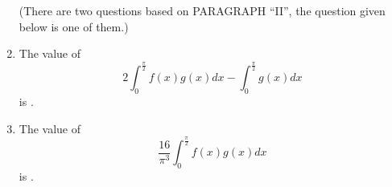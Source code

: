 \documentclass[12pt,a4paper]{article}
\begin{document}
\begin{enumerate}
(There are two questions based on PARAGRAPH ``II'', the question given below is one of them.)

\item The value of  
\[
    2 \int_{0}^{\frac{\pi}{2}} f(x) g(x)dx - \int_{0}^{\frac{\pi}{2}} g(x)dx
\]
    is \underline{\hspace{2cm}}.
\item The value of  
\[
    \frac{16}{\pi^3} \int_{0}^{\frac{\pi}{2}} f(x) g(x)dx
\]
    is \underline{\hspace{2cm}}.
\end{enumerate}
\end{document}
